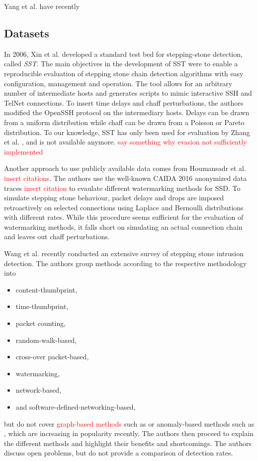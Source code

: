 \documentclass[conference]{IEEEtran}\usepackage[]{graphicx}\usepackage[]{color}
\begin{document}
Yang et al. \cite{yang2018sniffing} have recently 

\subsection{Datasets}


In 2006, Xin et al. \cite{xin2006testbed} developed a standard test bed for stepping-stone detection, called \textit{SST}. 
The main objectives in the development of SST were to enable a reproducible evaluation of stepping stone chain detection algorithms with easy configuration, management and operation. The tool allows for an arbitrary number of intermediate hosts and generates scripts to mimic interactive SSH and TelNet connections. 
To insert time delays and chaff perturbations, the authors modified the OpenSSH protocol on the intermediary hosts. Delays can be drawn from a uniform distribution while chaff can be drawn from a Poisson or Pareto distribution. To our knowledge, SST has only been used for evaluation by Zhang et al. \cite{zhang2005stepping}, and is not available anymore. \textcolor{red}{say something why evasion not sufficiently implemented}

Another approach to use publicly available data comes from Houmansadr et al. \textcolor{red}{insert citations}. The authors use the well-known CAIDA 2016 anonymized data traces \textcolor{red}{insert citation} to evaulate different watermarking methods for SSD. To simulate stepping stone behaviour, packet delays and drops are imposed retroactively on selected connections using Laplace and Bernoulli distributions with different rates. While this procedure seems sufficient for the evaluation of watermarking methods, it falls short on simulating an actual connection chain and leaves out chaff perturbations. 


Wang et al. \cite{wang2018research} recently conducted an extensive survey of  stepping stone intrusion detection. The authors group methods according to the respective methodology into 
\begin{itemize}
\item content-thumbprint,
\item time-thumbprint,
\item packet counting,
\item random-walk-based,
\item cross-over packet-based,
\item watermarking,
\item network-based,
\item and software-defined-networking-based, 
\end{itemize} 
but do not cover \textcolor{red}{graph-based methods} such as \cite{gamarra2018analysis} %
or anomaly-based methods such as \cite{di2011detecting}, which are increasing in popularity recently.
The authors then proceed to explain the different methods and highlight their benefits and shortcomings. The authors discuss open problems, but do not provide a comparison of detection rates. 
\end{document}
